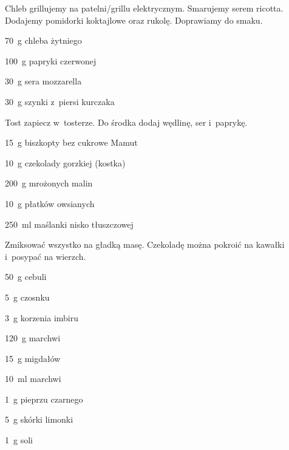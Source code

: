 \documentclass[../kucharek.tex]{subfiles}
\begin{document}
Chleb grillujemy na patelni/grillu elektrycznym. Smarujemy serem ricotta.
Dodajemy pomidorki koktajlowe oraz rukolę. Doprawiamy do smaku.


\begin{Ingred}
    \item \qty{70}{\gram} chleba żytniego
    \item \qty{100}{\gram} papryki czerwonej
    \item \qty{30}{\gram} sera mozzarella
    \item \qty{30}{\gram} szynki z~piersi kurczaka
\end{Ingred}

Tost zapiecz w~tosterze. Do środka dodaj wędlinę, ser i~paprykę.


\begin{Ingred}
    \item \qty{15}{\gram} biszkopty bez cukrowe Mamut
    \item \qty{10}{\gram} czekolady gorzkiej (kostka)
    \item \qty{200}{\gram} mrożonych malin
    \item \qty{10}{\gram} płatków owsianych
    \item \qty{250}{\milli\litre} maślanki nisko tłuszczowej
\end{Ingred}

Zmiksować wszystko na gładką masę. Czekoladę można pokroić na kawałki i~posypać
na wierzch.


\begin{Ingred}
    \item \qty{50}{\gram} cebuli
    \item \qty{5}{\gram} czosnku
    \item \qty{3}{\gram} korzenia imbiru
    \item \qty{120}{\gram} marchwi
    \item \qty{15}{\gram} migdałów
    \item \qty{10}{\milli\litre} marchwi
    \item \qty{1}{\gram} pieprzu czarnego
    \item \qty{5}{\gram} skórki limonki
    \item \qty{1}{\gram} soli
\end{Ingred}
\end{document}

